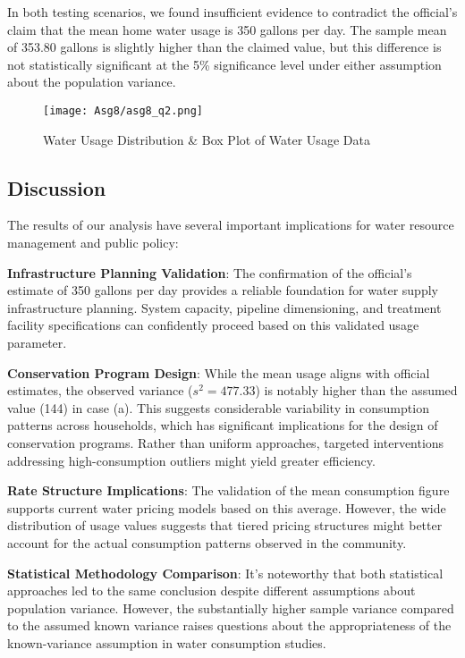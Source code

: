 \documentclass[12pt]{article}
\begin{document}
In both testing scenarios, we found insufficient evidence to contradict the official's claim that the mean home water usage is 350 gallons per day. The sample mean of 353.80 gallons is slightly higher than the claimed value, but this difference is not statistically significant at the 5\% significance level under either assumption about the population variance.

\begin{figure}[H]
    \centering
    \texttt{[image: Asg8/asg8\_q2.png]}
    \caption{Water Usage Distribution \& Box Plot of Water Usage Data}
    \label{fig:enter-label}
\end{figure}

\subsection{Discussion}
The results of our analysis have several important implications for water resource management and public policy:

\textbf{Infrastructure Planning Validation}: The confirmation of the official's estimate of 350 gallons per day provides a reliable foundation for water supply infrastructure planning. System capacity, pipeline dimensioning, and treatment facility specifications can confidently proceed based on this validated usage parameter.

\textbf{Conservation Program Design}: While the mean usage aligns with official estimates, the observed variance ($s^2 = 477.33$) is notably higher than the assumed value (144) in case (a). This suggests considerable variability in consumption patterns across households, which has significant implications for the design of conservation programs. Rather than uniform approaches, targeted interventions addressing high-consumption outliers might yield greater efficiency.

\textbf{Rate Structure Implications}: The validation of the mean consumption figure supports current water pricing models based on this average. However, the wide distribution of usage values suggests that tiered pricing structures might better account for the actual consumption patterns observed in the community.

\textbf{Statistical Methodology Comparison}: It's noteworthy that both statistical approaches led to the same conclusion despite different assumptions about population variance. However, the substantially higher sample variance compared to the assumed known variance raises questions about the appropriateness of the known-variance assumption in water consumption studies.
\end{document}

